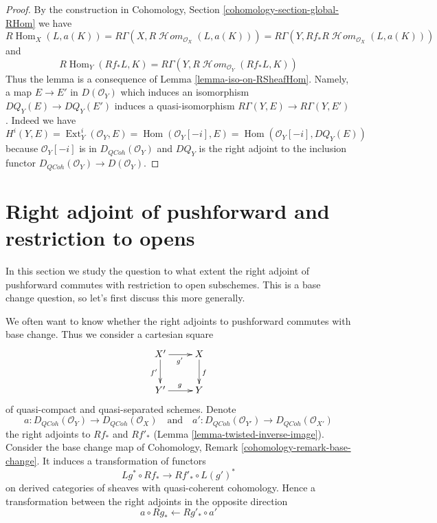 \documentclass{stacks-project}
\theoremstyle{plain}
\theoremstyle{definition}
\theoremstyle{remark}
\numberwithin{equation}{subsection}
\def\Hom{\mathop{\mathrm{Hom}}\nolimits}
\def\Ext{\mathop{\mathrm{Ext}}\nolimits}
\def\SheafHom{\mathop{\mathcal{H}\!\mathit{om}}\nolimits}
\def\QCoh{\mathit{QCoh}}
\begin{document}
\begin{proof}
By the construction in
Cohomology, Section \ref{cohomology-section-global-RHom}
we have
$$
R\Hom_X(L, a(K)) =
R\Gamma(X, R\SheafHom_{\mathcal{O}_X}(L, a(K))) =
R\Gamma(Y, Rf_*R\SheafHom_{\mathcal{O}_X}(L, a(K)))
$$
and
$$
R\Hom_Y(Rf_*L, K) = R\Gamma(Y, R\SheafHom_{\mathcal{O}_Y}(Rf_*L, K))
$$
Thus the lemma is a consequence of Lemma \ref{lemma-iso-on-RSheafHom}.
Namely, a map $E \to E'$ in $D(\mathcal{O}_Y)$ which induces
an isomorphism $DQ_Y(E) \to DQ_Y(E')$ induces a quasi-isomorphism
$R\Gamma(Y, E) \to R\Gamma(Y, E')$. Indeed we have
$H^i(Y, E) = \Ext^i_Y(\mathcal{O}_Y, E) = \Hom(\mathcal{O}_Y[-i], E) =
\Hom(\mathcal{O}_Y[-i], DQ_Y(E))$ because $\mathcal{O}_Y[-i]$
is in $D_\QCoh(\mathcal{O}_Y)$ and $DQ_Y$ is the right adjoint
to the inclusion functor $D_\QCoh(\mathcal{O}_Y) \to D(\mathcal{O}_Y)$.
\end{proof}







\section{Right adjoint of pushforward and restriction to opens}
\label{section-restriction-to-opens}

\noindent
In this section we study the question to what extent the right adjoint
of pushforward commutes with restriction to open subschemes. This is
a base change question, so let's first discuss this more generally.

\medskip\noindent
We often want to know whether the right adjoints to pushforward commutes
with base change. Thus we consider a cartesian square
\begin{equation}
\label{equation-base-change}
\vcenter{
\xymatrix{
X' \ar[r]_{g'} \ar[d]_{f'} & X \ar[d]^f \\
Y' \ar[r]^g & Y
}
}
\end{equation}
of quasi-compact and quasi-separated schemes.
Denote
$$
a  : D_\QCoh(\mathcal{O}_Y) \to D_\QCoh(\mathcal{O}_X)
\quad\text{and}\quad
a'  : D_\QCoh(\mathcal{O}_{Y'}) \to D_\QCoh(\mathcal{O}_{X'})
$$
the right adjoints to $Rf_*$ and $Rf'_*$
(Lemma \ref{lemma-twisted-inverse-image}).
Consider the base change map of
Cohomology, Remark \ref{cohomology-remark-base-change}.
It induces a transformation of functors
$$
Lg^* \circ Rf_* \longrightarrow Rf'_* \circ L(g')^*
$$
on derived categories of sheaves with quasi-coherent cohomology.
Hence a transformation between the right adjoints in the opposite direction
$$
a \circ Rg_* \longleftarrow Rg'_* \circ a'
$$
\end{document}
